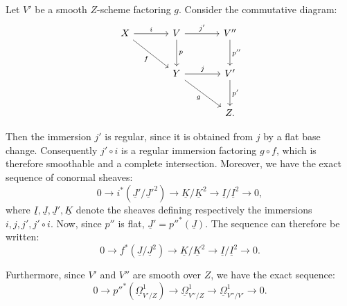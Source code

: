 Let $V'$ be a smooth $Z$-scheme factoring $g$. Consider the commutative diagram:
\[
\begin{tikzcd}[column sep=large,row sep=large]
X \arrow[r,"i"] \arrow[dr,"f"'] & V \arrow[r,"j'"] \arrow[d,"p"] & V'' \arrow[d,"p''"]\\
& Y \arrow[r,"j"] \arrow[dr,"g"'] & V' \arrow[d,"p'"]\\
& & Z .
\end{tikzcd}
\]

Then the immersion $j'$ is regular, since it is obtained from $j$ by a flat base change. Consequently $j'\circ i$ is a regular immersion factoring $g\circ f$, which is therefore smoothable and a complete intersection. Moreover, we have the exact sequence of conormal sheaves:
\[
0\longrightarrow i^*(\underline{J}'/\underline{J}'^2)\longrightarrow \underline{K}/\underline{K}^2\longrightarrow \underline{I}/\underline{I}^2\longrightarrow0,
\]
where $\underline{I},\underline{J},\underline{J}',\underline{K}$ denote the sheaves defining respectively the immersions $i,j,j',j'\circ i$. Now, since $p''$ is flat, $\underline{J}'=p''^*(\underline{J})$. The sequence can therefore be written:
\begin{equation}\tag{2.6.1}
0\longrightarrow f^*(\underline{J}/\underline{J}^2)\longrightarrow \underline{K}/\underline{K}^2\longrightarrow \underline{I}/\underline{I}^2\longrightarrow0.
\end{equation}

Furthermore, since $V'$ and $V''$ are smooth over $Z$, we have the exact sequence:
\[
0\longrightarrow p''^*(\underline{\Omega}^1_{V'/Z})\longrightarrow\underline{\Omega}^1_{V''/Z}\longrightarrow\underline{\Omega}^1_{V''/V'}\longrightarrow0.
\]
